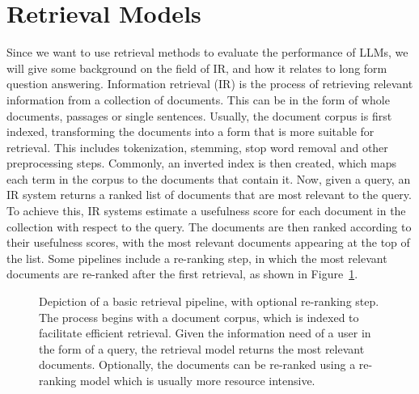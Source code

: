 \section{Retrieval Models}\label{sec:retrieval-models}
Since we want to use retrieval methods to evaluate the performance of LLMs, we will give some background on  the field of IR, and how it relates to long form question answering.
Information retrieval (IR) is the process of retrieving relevant information from a collection of documents.
This can be in the form of whole documents, passages or single sentences.
Usually, the document corpus is first indexed, transforming the documents into a form that is more suitable for retrieval.
This includes tokenization, stemming, stop word removal and other preprocessing steps.
Commonly, an inverted index is then created, which maps each term in the corpus to the documents that contain it.
Now, given a query, an IR system returns a ranked list of documents that are most relevant to the query.
To achieve this, IR systems estimate a usefulness score for each document in the collection with respect to the query.
The documents are then ranked according to their usefulness scores, with the most relevant documents appearing at the top of the list.
Some pipelines include a re-ranking step, in which the most relevant documents are re-ranked after the first retrieval, as shown in Figure~\ref{fig:reranking_pipeline}.
\begin{figure}[tb]
\centering
{}
\caption{Depiction of a basic retrieval pipeline, with optional re-ranking step. The process begins with a document corpus, which is indexed to facilitate efficient retrieval. Given the information need of a user in the form of a query, the retrieval model returns the most relevant documents. Optionally, the documents can be re-ranked using a re-ranking model which is usually more resource intensive.}
\label{fig:reranking_pipeline}
\end{figure}

